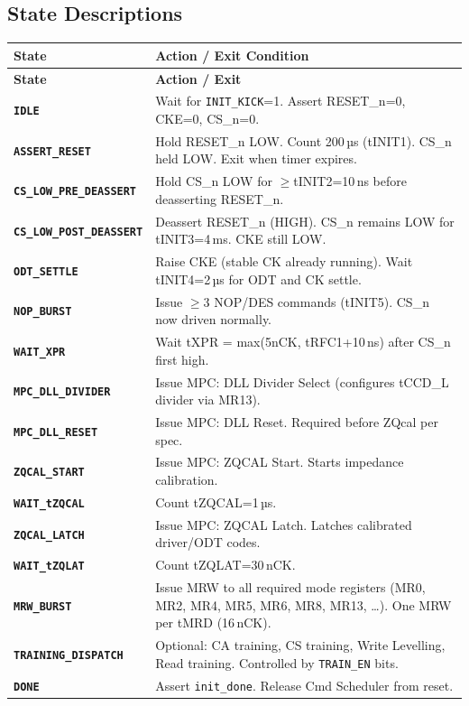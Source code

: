 \documentclass[11pt,a4paper]{article}
\newcommand{\reg}[1]{\textcolor{ddrpurple}{\texttt{#1}}}
\newcommand{\st}[1]{\textcolor{ddrblue}{\texttt{\textbf{#1}}}}
\begin{document}
\subsection{State Descriptions}

\begin{longtable}{L{3.2cm} L{11.3cm}}
\toprule
\textbf{State} & \textbf{Action / Exit Condition} \\
\midrule
\endfirsthead\toprule\textbf{State}&\textbf{Action / Exit}\\\midrule\endhead\bottomrule\endfoot
{}
\st{IDLE}            & Wait for \reg{INIT\_KICK}=1. Assert RESET\_n=0, CKE=0, CS\_n=0. \\
\st{ASSERT\_RESET}   & Hold RESET\_n LOW. Count 200\,µs (tINIT1). CS\_n held LOW. Exit when timer expires. \\
\st{CS\_LOW\_PRE\_DEASSERT} & Hold CS\_n LOW for $\geq$tINIT2=10\,ns before deasserting RESET\_n. \\
\st{CS\_LOW\_POST\_DEASSERT} & Deassert RESET\_n (HIGH). CS\_n remains LOW for tINIT3=4\,ms. CKE still LOW. \\
\st{ODT\_SETTLE}     & Raise CKE (stable CK already running). Wait tINIT4=2\,µs for ODT and CK settle. \\
\st{NOP\_BURST}      & Issue $\geq$3 NOP/DES commands (tINIT5). CS\_n now driven normally. \\
\st{WAIT\_XPR}       & Wait tXPR = max(5nCK, tRFC1+10\,ns) after CS\_n first high. \\
\st{MPC\_DLL\_DIVIDER} & Issue MPC: DLL Divider Select (configures tCCD\_L divider via MR13). \\
\st{MPC\_DLL\_RESET} & Issue MPC: DLL Reset. Required before ZQcal per spec. \\
\st{ZQCAL\_START}    & Issue MPC: ZQCAL Start. Starts impedance calibration. \\
\st{WAIT\_tZQCAL}    & Count tZQCAL=1\,µs. \\
\st{ZQCAL\_LATCH}    & Issue MPC: ZQCAL Latch. Latches calibrated driver/ODT codes. \\
\st{WAIT\_tZQLAT}    & Count tZQLAT=30\,nCK. \\
\st{MRW\_BURST}      & Issue MRW to all required mode registers (MR0, MR2, MR4, MR5, MR6, MR8, MR13, \ldots). One MRW per tMRD (16\,nCK). \\
\st{TRAINING\_DISPATCH} & Optional: CA training, CS training, Write Levelling, Read training. Controlled by \reg{TRAIN\_EN} bits. \\
\st{DONE}            & Assert \texttt{init\_done}. Release Cmd Scheduler from reset. \\
\end{longtable}
\end{document}
